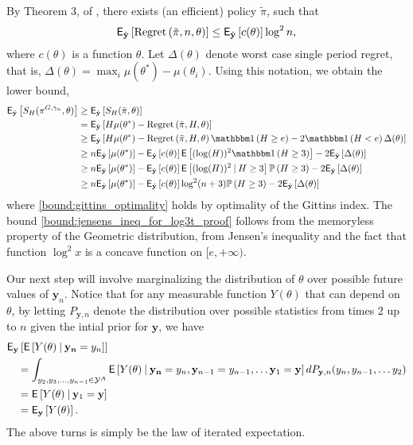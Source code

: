 \begin{myproof}[Proof.]
	By Theorem 3, of \cite{lai1987adaptive}, there exists (an efficient) policy $\tilde \pi$, such that 
	\[
	\mathsf{E}_{\hat{\mathbf y}}\left[\textnormal{Regret} \left( \tilde \pi, n, \theta \right) \right] \le \mathsf{E}_{\hat{\mathbf y}}\left[c(\theta)\right] \log^2 n,
	\] 
	where $c(\theta)$ is a function $\theta$.
	Let $\Delta(\theta)$ denote worst case  single period regret, that is, $\Delta(\theta) =  \max_{i} \mu(\theta^*) - \mu(\theta_i)$. Using this notation, we obtain the lower bound,
	\begin{align}
	\E_{\hat{\mathbf y}}\left[S_H(\pi^{G, \gamma_n}, \theta)\right] & \ge \E_{\hat{\mathbf y}}\left[S_H(\tilde \pi, \theta)\right]  \label{bound:gittins_optimality} \\
	&  =  \E_{\hat{\mathbf y}}\left[H\mu(\theta^*) - \Regret{\tilde \pi, H, \theta}\right] \nonumber \\
	& \ge  \E_{\hat{\mathbf y}}\left[H\mu(\theta^*) -\Regret{\tilde \pi, H, \theta}\ind{H \ge e} - 2\ind{H < e}\Delta(\theta)\right] \nonumber \\
	& \ge n \E_{\hat{\mathbf y}}\left[\mu(\theta^*)\right] - \E_{\hat{\mathbf y}}\left[c(\theta)\right] \Ee{(\log (H))^2 \ind{H \ge 3} } - 2\E_{\hat{\mathbf y}}\left[\Delta(\theta)\right] \nonumber \\
	& \ge n  \E_{\hat{\mathbf y}}\left[\mu(\theta^*)\right] - \E_{\hat{\mathbf y}}\left[c(\theta)\right] \Ee{(\log (H))^2 \given H \ge 3}\P{H \ge 3} - 2\E_{\hat{\mathbf y}}\left[\Delta(\theta)\right] \nonumber \\
	& \ge n  \E_{\hat{\mathbf y}}\left[\mu(\theta^*)\right] - \E_{\hat{\mathbf y}}\left[c(\theta)\right] \log^2 (n+3)\P{H \ge 3} - 2\E_{\hat{\mathbf y}}\left[\Delta(\theta)\right]\label{bound:jensens_ineq_for_log3t_proof}
	\end{align}
	where \eqref{bound:gittins_optimality} holds by optimality of the Gittins index. The bound \eqref{bound:jensens_ineq_for_log3t_proof} follows from the memoryless property of the Geometric distribution, from Jensen's inequality and the fact that function $\log^2 x$ is a concave function on $[e,+\infty)$. 
	
	Our next step will involve marginalizing the distribution of $\theta$ over possible future values of $\mathbf y_n$. Notice that for any measurable function $Y(\theta)$ that can depend on $\theta$, by letting $P_{\mathbf y,n}$ denote the distribution over possible statistics from times $2$ up to $n$ given the intial prior for $\mathbf y$, we have
	\begin{align}
		& \mathsf{E}_{\mathbf y}\left[\mathsf{E} \left[  Y(\theta) \:\vert\: \mathbf{y_n} = y_n \right]\right] \nonumber \\
		& \quad = \int_{y_2,y_3,\ldots,y_{n-1} \in \mathcal{Y}^A}\mathsf{E} \left[  Y(\theta) \:\vert\: \mathbf{y_n} = y_n, \mathbf y_{n-1} = y_{n-1}, \ldots \mathbf y_1 = \mathbf{y} \right] dP_{\mathbf y,n}(y_n, y_{n-1}, \ldots y_{2}) \nonumber \\
		& \quad = \mathsf{E} \left[  Y(\theta) \:\vert\: \mathbf y_1 = \mathbf{y} \right] \nonumber \\
		& \quad = \mathsf{E}_{\mathbf y}\left[Y(\theta)\right]. \label{eqn:tower_prop_for_ytheta}
	\end{align}
	The above turns is simply be the law of iterated expectation. 
	

\end{myproof}
